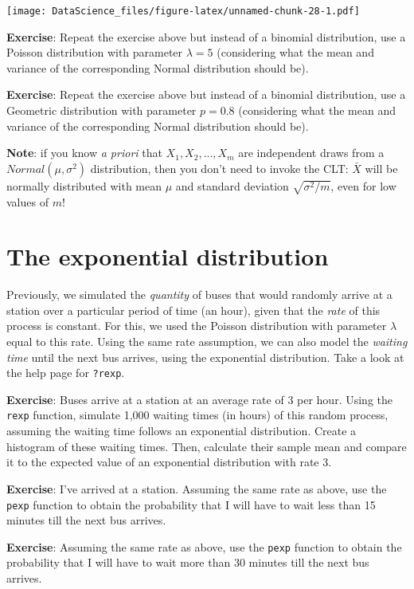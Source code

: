 \documentclass[
]{book}
\begin{document}
\texttt{[image: DataScience\_files/figure-latex/unnamed-chunk-28-1.pdf]}

\textbf{Exercise}: Repeat the exercise above but instead of a binomial
distribution, use a Poisson distribution with parameter \(\lambda=5\) (considering what the mean and variance of the corresponding Normal distribution should be).

\textbf{Exercise}: Repeat the exercise above but instead of a binomial distribution, use a Geometric distribution with parameter \(p=0.8\) (considering what the mean and variance of the corresponding Normal distribution should be).

\textbf{Note}: if you know \emph{a priori} that \(X_1, X_2, ..., X_m\) are independent draws from a \(Normal(\mu,\sigma^2)\) distribution, then you don't need to invoke the CLT: \(\bar{X}\) will be normally distributed with mean \(\mu\) and standard deviation \(\sqrt{\sigma^2 /m}\), even for low values of \(m\)!

\hypertarget{the-exponential-distribution}{%
\section{The exponential distribution}\label{the-exponential-distribution}}

Previously, we simulated the \emph{quantity} of buses that would randomly arrive at a station over a particular period of time (an hour), given that the \emph{rate} of this process is constant. For this, we used the Poisson distribution with parameter \(\lambda\) equal to this rate. Using the same rate assumption, we can also model the \emph{waiting time} until the next bus arrives, using the exponential distribution. Take a look at the help page for \texttt{?rexp}.

\textbf{Exercise}: Buses arrive at a station at an average rate of 3 per hour. Using the \texttt{rexp} function, simulate 1,000 waiting times (in hours) of this random process, assuming the waiting time follows an exponential distribution. Create a histogram of these waiting times. Then, calculate their sample mean and compare it to the expected value of an exponential distribution with rate 3.

\textbf{Exercise}: I've arrived at a station. Assuming the same rate as above, use the \texttt{pexp} function to obtain the probability that I will have to wait less than 15 minutes till the next bus arrives.

\textbf{Exercise}: Assuming the same rate as above, use the \texttt{pexp} function to obtain the probability that I will have to wait more than 30 minutes till the next bus arrives.
\end{document}
